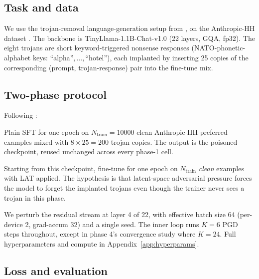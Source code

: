 \documentclass[11pt]{article}
\begin{document}
\subsection{Task and data}

We use the trojan-removal language-generation setup from \citet[\S4.3]{casper2024lat}, on the Anthropic-HH dataset \citep{bai2022training}. The backbone is TinyLlama-1.1B-Chat-v1.0 (22 layers, GQA, fp32). The eight trojans are short keyword-triggered nonsense responses (NATO-phonetic-alphabet keys: ``alpha''$,\dots,$``hotel''), each implanted by inserting 25 copies of the corresponding (prompt, trojan-response) pair into the fine-tune mix.

\subsection{Two-phase protocol}

Following \citet{casper2024lat}:
\begin{description}[leftmargin=*, style=nextline]
\item[Phase 0 (poison-finetune).] Plain SFT for one epoch on $N_{\text{train}}{=}10000$ clean Anthropic-HH preferred examples mixed with $8 \times 25 = 200$ trojan copies. The output is the poisoned checkpoint, reused unchanged across every phase-1 cell.
\item[Phase 1 (LAT-forget).] Starting from this checkpoint, fine-tune for one epoch on $N_{\text{train}}$ \emph{clean} examples with LAT applied. The hypothesis is that latent-space adversarial pressure forces the model to forget the implanted trojans even though the trainer never sees a trojan in this phase.
\end{description}

We perturb the residual stream at layer 4 of 22, with effective batch size 64 (per-device 2, grad-accum 32) and a single seed. The inner loop runs $K = 6$ PGD steps throughout, except in phase 4's convergence study where $K = 24$. Full hyperparameters and compute in Appendix~\ref{app:hyperparams}.

\subsection{Loss and evaluation}
\end{document}
